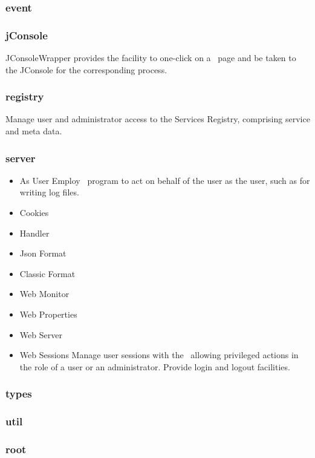     \subsubsection{event}
         
    \subsubsection{jConsole}
    
    JConsoleWrapper provides the facility to one-click on a \varDUCC~\varWebServer page
    and be taken to the JConsole for the corresponding process.
    
    \subsubsection{registry}
    
    Manage user and administrator access to the Services Registry, comprising service and meta data.    
    \subsubsection{server}
    
    \begin{itemize}
      \item As User
      Employ \varSetUid~program to act on behalf of the user as the user, such as for writing
      log files.
      \item Cookies
      \item Handler
      \item Json Format
      \item Classic Format
      \item Web Monitor
      \item Web Properties
      \item Web Server
      \item Web Sessions
      Manage user sessions with the \varWebServer~allowing privileged actions in the
      role of a user or an administrator.
      Provide login and logout facilities.
    \end{itemize} 
         
    \subsubsection{types}
    
    \subsubsection{util}
    
    \subsubsection{root}